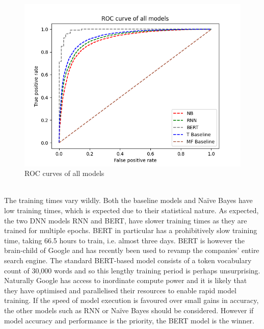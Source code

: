 \documentclass{svproc}
\begin{document}
\\
\begin{figure}
  \centering
    \includegraphics[scale=0.50]{ROC.PNG}
    \caption{ROC curves of all models}
\end{figure}
\\
The training times vary wildly. Both the baseline models and Naïve Bayes have low training times, which is expected due to their statistical nature. As expected, the two DNN models RNN and BERT, have slower training times as they are trained for multiple epochs. BERT in particular has a prohibitively slow training time, taking 66.5 hours to train, i.e. almost three days. BERT is however the brain-child of Google and has recently been used to revamp the companies' entire search engine. The standard BERT-based model consists of a token vocabulary count of 30,000 words and so this lengthy training period is perhaps unsurprising. Naturally Google has access to inordinate compute power and it is likely that they have optimised and parallelised their resources to enable rapid model training. If the speed of model execution is favoured over small gains in accuracy, the other models such as RNN or Naïve Bayes should be considered. However if model accuracy and performance is the priority, the BERT model is the winner.
\end{document}
